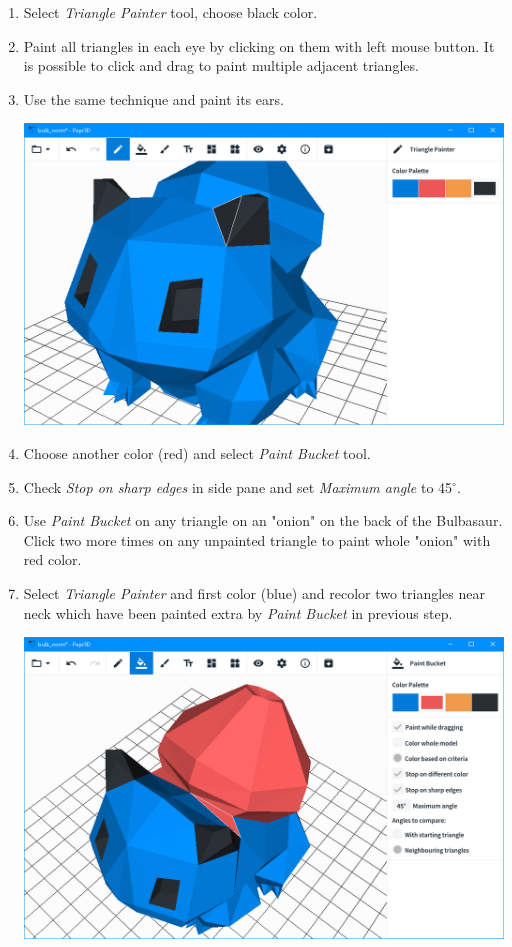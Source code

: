 \begin{enumerate}
\item Select \textit{Triangle Painter} tool, choose black color.
\item Paint all triangles in each eye by clicking on them with left mouse button. It is possible to click and drag to paint multiple adjacent triangles.
\item Use the same technique and paint its ears.

\begin{center}
\includegraphics[scale=0.4]{images/bulb_eyes.png}
\end{center}

\item Choose another color (red) and select \textit{Paint Bucket} tool.
\item Check \textit{Stop on sharp edges} in side pane and set \textit{Maximum angle} to 45$^\circ$.
\item Use \textit{Paint Bucket} on any triangle on an "onion" on the back of the Bulbasaur. Click two more times on any unpainted triangle to paint whole "onion" with red color.
\item Select \textit{Triangle Painter} and first color (blue) and recolor two triangles near neck which have been painted extra by \textit{Paint Bucket} in previous step.

\begin{center}
\includegraphics[scale=0.4]{images/bulb_onion.png}
\end{center}


\end{enumerate}
